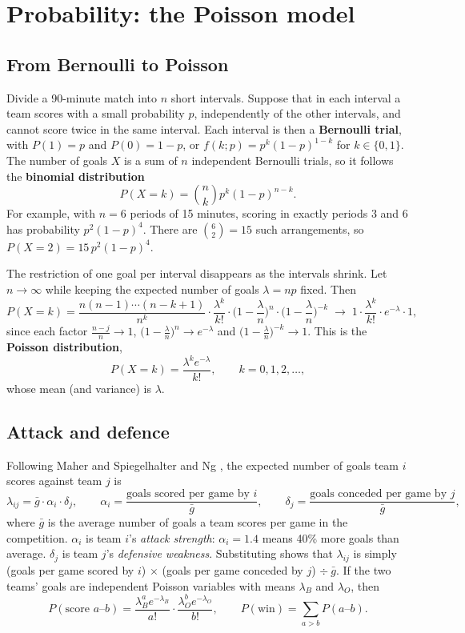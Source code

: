 \documentclass[11pt,a4paper]{article}
\begin{document}
\section{Probability: the Poisson model}\label{sec:poisson}

\subsection{From Bernoulli to Poisson}

Divide a 90-minute match into $n$ short intervals. Suppose that in each interval a team scores with a small probability $p$, independently of the other intervals, and cannot score twice in the same interval. Each interval is then a \textbf{Bernoulli trial}, with $P(1) = p$ and $P(0) = 1-p$, or $f(k;p) = p^k(1-p)^{1-k}$ for $k\in\{0,1\}$. The number of goals $X$ is a sum of $n$ independent Bernoulli trials, so it follows the \textbf{binomial distribution}
\[
P(X = k) = \binom{n}{k} p^k (1-p)^{n-k}.
\]
For example, with $n = 6$ periods of 15 minutes, scoring in exactly periods 3 and 6 has probability $p^2(1-p)^4$. There are $\binom{6}{2} = 15$ such arrangements, so $P(X=2) = 15\,p^2(1-p)^4$.

The restriction of one goal per interval disappears as the intervals shrink. Let $n\to\infty$ while keeping the expected number of goals $\lambda = np$ fixed. Then
\[
P(X=k) = \frac{n(n-1)\cdots(n-k+1)}{n^k}\cdot\frac{\lambda^k}{k!}\cdot\Big(1-\frac{\lambda}{n}\Big)^{n}\cdot\Big(1-\frac{\lambda}{n}\Big)^{-k}
\;\longrightarrow\; 1\cdot\frac{\lambda^k}{k!}\cdot e^{-\lambda}\cdot 1 ,
\]
since each factor $\frac{n-j}{n}\to 1$, $\big(1-\frac{\lambda}{n}\big)^n \to e^{-\lambda}$ and $\big(1-\frac{\lambda}{n}\big)^{-k}\to 1$. This is the \textbf{Poisson distribution},
\[
P(X = k) = \frac{\lambda^k e^{-\lambda}}{k!}, \qquad k = 0, 1, 2, \ldots,
\]
whose mean (and variance) is $\lambda$.

\subsection{Attack and defence}

Following Maher \cite{maher} and Spiegelhalter and Ng \cite{spiegelhalter}, the expected number of goals team $i$ scores against team $j$ is
\[
\lambda_{ij} = \bar g \cdot \alpha_i \cdot \delta_j, \qquad
\alpha_i = \frac{\text{goals scored per game by } i}{\bar g}, \qquad
\delta_j = \frac{\text{goals conceded per game by } j}{\bar g},
\]
where $\bar g$ is the average number of goals a team scores per game in the competition. $\alpha_i$ is team $i$'s \emph{attack strength}: $\alpha_i = 1.4$ means 40\% more goals than average. $\delta_j$ is team $j$'s \emph{defensive weakness}. Substituting shows that $\lambda_{ij}$ is simply (goals per game scored by $i$) $\times$ (goals per game conceded by $j$) $\div\ \bar g$. If the two teams' goals are independent Poisson variables with means $\lambda_B$ and $\lambda_O$, then
\[
P(\text{score } a\text{--}b) = \frac{\lambda_B^a e^{-\lambda_B}}{a!}\cdot\frac{\lambda_O^b e^{-\lambda_O}}{b!}, \qquad
P(\text{win}) = \sum_{a > b} P(a\text{--}b).
\]
\end{document}
